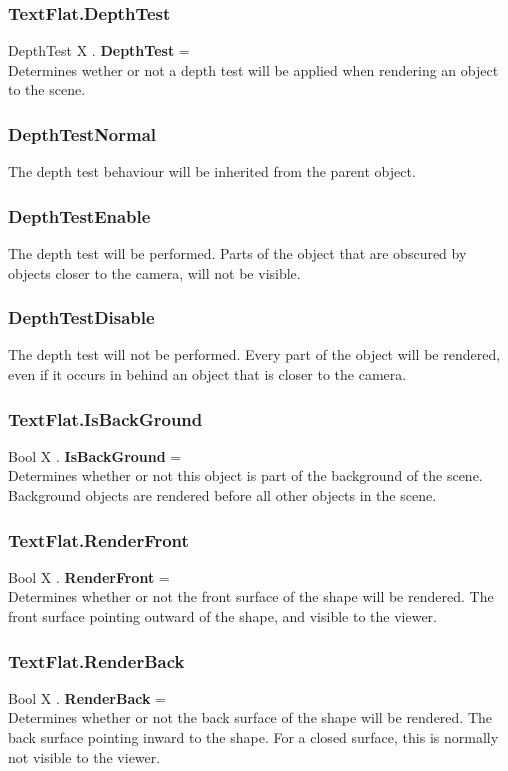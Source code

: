 \documentclass[10pt]{book}
\begin{document}
\subsubsection{TextFlat.DepthTest \label{F:TextFlat:DepthTest}}
DepthTest X . \textbf{DepthTest} = \\
Determines wether or not a depth test will be applied when rendering an object to the scene.

\subsubsection{DepthTestNormal \label{T:DepthTest|DepthTestNormal}}
The depth test behaviour will be inherited from the parent object.

\subsubsection{DepthTestEnable \label{T:DepthTest|DepthTestEnable}}
The depth test will be performed. Parts of the object that are obscured by objects closer to the camera, will not be visible.

\subsubsection{DepthTestDisable \label{T:DepthTest|DepthTestDisable}}
The depth test will not be performed. Every part of the object will be rendered, even if it occurs in behind an object that is closer to the camera.

\subsubsection{TextFlat.IsBackGround \label{F:TextFlat:IsBackGround}}
Bool X . \textbf{IsBackGround} = \\
Determines whether or not this object is part of the background of the scene. Background objects are rendered before all other objects in the scene.

\subsubsection{TextFlat.RenderFront \label{F:TextFlat:RenderFront}}
Bool X . \textbf{RenderFront} = \\
Determines whether or not the front surface of the shape will be rendered. The front surface pointing outward of the shape, and visible to the viewer.

\subsubsection{TextFlat.RenderBack \label{F:TextFlat:RenderBack}}
Bool X . \textbf{RenderBack} = \\
Determines whether or not the back surface of the shape will be rendered. The back surface pointing inward to the shape. For a closed surface, this is normally not visible to the viewer.
\end{document}
